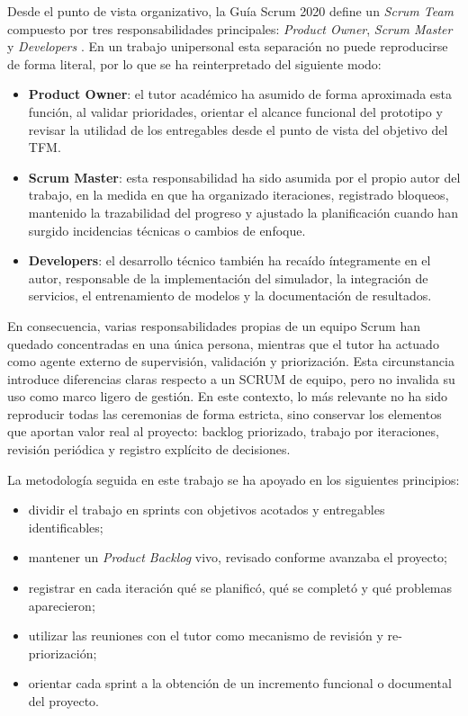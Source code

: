 Desde el punto de vista organizativo, la Guía Scrum 2020 define un \textit{Scrum Team} compuesto por tres responsabilidades principales: \textit{Product Owner}, \textit{Scrum Master} y \textit{Developers} \cite{ScrumGuide2020}. En un trabajo unipersonal esta separación no puede reproducirse de forma literal, por lo que se ha reinterpretado del siguiente modo:
\begin{itemize}
  \item \textbf{Product Owner}: el tutor académico ha asumido de forma aproximada esta función, al validar prioridades, orientar el alcance funcional del prototipo y revisar la utilidad de los entregables desde el punto de vista del objetivo del TFM.
  \item \textbf{Scrum Master}: esta responsabilidad ha sido asumida por el propio autor del trabajo, en la medida en que ha organizado iteraciones, registrado bloqueos, mantenido la trazabilidad del progreso y ajustado la planificación cuando han surgido incidencias técnicas o cambios de enfoque.
  \item \textbf{Developers}: el desarrollo técnico también ha recaído íntegramente en el autor, responsable de la implementación del simulador, la integración de servicios, el entrenamiento de modelos y la documentación de resultados.
\end{itemize}

En consecuencia, varias responsabilidades propias de un equipo Scrum han quedado concentradas en una única persona, mientras que el tutor ha actuado como agente externo de supervisión, validación y priorización. Esta circunstancia introduce diferencias claras respecto a un SCRUM de equipo, pero no invalida su uso como marco ligero de gestión. En este contexto, lo más relevante no ha sido reproducir todas las ceremonias de forma estricta, sino conservar los elementos que aportan valor real al proyecto: backlog priorizado, trabajo por iteraciones, revisión periódica y registro explícito de decisiones.

La metodología seguida en este trabajo se ha apoyado en los siguientes principios:
\begin{itemize}
  \item dividir el trabajo en sprints con objetivos acotados y entregables identificables;
  \item mantener un \textit{Product Backlog} vivo, revisado conforme avanzaba el proyecto;
  \item registrar en cada iteración qué se planificó, qué se completó y qué problemas aparecieron;
  \item utilizar las reuniones con el tutor como mecanismo de revisión y re-priorización;
  \item orientar cada sprint a la obtención de un incremento funcional o documental del proyecto.
\end{itemize}

